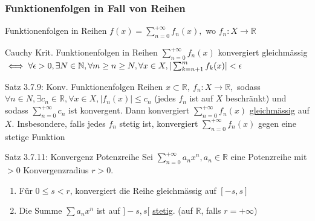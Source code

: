 \documentclass[a4paper,10pt]{article}
\begin{document}
\subsubsection{Funktionenfolgen in Fall von Reihen}
\begin{defbox}
    {Funktionenfolgen in Reihen}
    $f(x)=\sum_{n=0}^{+\infty}f_n(x),$ wo $f_n:X\longrightarrow \mathbb R$
\end{defbox}
\begin{tbox}
    {Cauchy Krit. Funktionenfolgen in Reihen}
    $\sum_{n=0}^{+\infty} f_n(x)$ konvergiert gleichmässig $\iff \forall \epsilon > 0, \exists N \in \mathbb N, \forall m \ge n\ge N, \forall x\in X,
    \\|\sum_{k=n+1}^{m} f_k(x)|<\epsilon$
\end{tbox}
\begin{tbox}
    {Satz 3.7.9: Konv. Funktionenfolgen Reihen}
    $x\subset \mathbb R,\ f_n: X \longrightarrow\mathbb R,$ sodass $\forall n \in N, \exists c_n \in \mathbb R, \forall x\in X, |f_n(x)|\le c_n$ (jedes $f_n$ ist auf $X$ beschränkt) und sodass $\sum_{n=0}^{+\infty}c_n$ ist konvergent. Dann konvergiert $\sum_{n=0}^{+\infty}f_n(x)$ \underline{gleichmässig} auf $X$. Insbesondere, falls jedes $f_n$ stetig ist, konvergiert $\sum_{n=0}^{+\infty}f_n(x)$ gegen eine stetige Funktion
\end{tbox}
\begin{tbox}
    {Satz 3.7.11: Konvergenz Potenzreihe}
    Sei $\sum_{n=0}^{+\infty}a_nx^n, a_n\in \mathbb R$ eine Potenzreihe mit $>0$ Konvergenzradius $r>0$.
    \begin{enumerate}
        \item Für $0\le s <r$, konvergiert die Reihe gleichmässig auf $[-s,s]$
        \item Die Summe $\sum a_nx^n$ ist auf $]-s,s[$ \underline{stetig}. (auf $\mathbb R$, falls $r=+\infty$)
    \end{enumerate}
\end{tbox}
\end{document}
